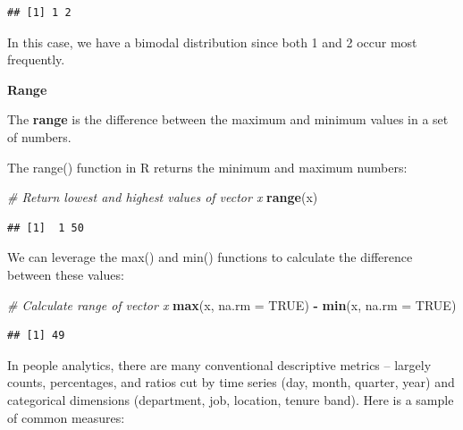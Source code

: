 \documentclass[]{book}
\newenvironment{Shaded}{\begin{snugshade}}{\end{snugshade}}
\newcommand{\CommentTok}[1]{\textcolor[rgb]{0.56,0.35,0.01}{\textit{#1}}}
\newcommand{\DataTypeTok}[1]{\textcolor[rgb]{0.13,0.29,0.53}{#1}}
\newcommand{\KeywordTok}[1]{\textcolor[rgb]{0.13,0.29,0.53}{\textbf{#1}}}
\newcommand{\NormalTok}[1]{#1}
\newcommand{\OperatorTok}[1]{\textcolor[rgb]{0.81,0.36,0.00}{\textbf{#1}}}
\newcommand{\OtherTok}[1]{\textcolor[rgb]{0.56,0.35,0.01}{#1}}
\newcommand{\StringTok}[1]{\textcolor[rgb]{0.31,0.60,0.02}{#1}}
\begin{document}
\begin{verbatim}
## [1] 1 2
\end{verbatim}

In this case, we have a bimodal distribution since both 1 and 2 occur most frequently.

\textbf{Range}

The \textbf{range} is the difference between the maximum and minimum values in a set of numbers.

The range() function in R returns the minimum and maximum numbers:

\begin{Shaded}
\begin{Highlighting}[]
\CommentTok{# Return lowest and highest values of vector x}
\KeywordTok{range}\NormalTok{(x)}
\end{Highlighting}
\end{Shaded}

\begin{verbatim}
## [1]  1 50
\end{verbatim}

We can leverage the max() and min() functions to calculate the difference between these values:

\begin{Shaded}
\begin{Highlighting}[]
\CommentTok{# Calculate range of vector x}
\KeywordTok{max}\NormalTok{(x, }\DataTypeTok{na.rm =} \OtherTok{TRUE}\NormalTok{) }\OperatorTok{-}\StringTok{ }\KeywordTok{min}\NormalTok{(x, }\DataTypeTok{na.rm =} \OtherTok{TRUE}\NormalTok{)}
\end{Highlighting}
\end{Shaded}

\begin{verbatim}
## [1] 49
\end{verbatim}

In people analytics, there are many conventional descriptive metrics -- largely counts, percentages, and ratios cut by time series (day, month, quarter, year) and categorical dimensions (department, job, location, tenure band). Here is a sample of common measures:
\end{document}
